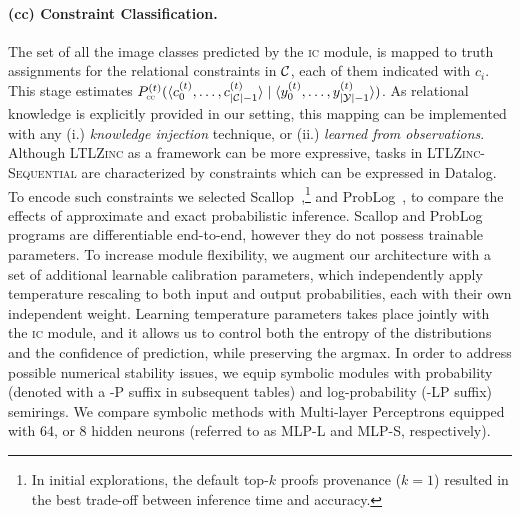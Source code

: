 \paragraph{{\sc (cc)} Constraint Classification.} The set of all the image classes predicted by the \textsc{ic} module, is mapped to truth assignments for the relational constraints in ${\mathcal{C}}$, each of them indicated with $c_i$. This stage estimates $P^{(t)}_{\text{\sc\tiny cc}}(\langle c_{0}^{(t)}, \ldots, c_{|{\mathcal{C}}| - 1}^{(t)}\rangle \mid \langle y_{0}^{(t)}, \ldots, y_{|{\mathcal{Y}}|-1}^{(t)}\rangle)$. As relational knowledge is explicitly provided in our setting, this mapping can be implemented with any (i.) \textit{knowledge injection} technique, or (ii.) \textit{learned from observations}. 
Although \textsc{LTLZinc} as a framework can be more expressive, tasks in \textsc{LTLZinc-Sequential} are characterized by constraints which can be expressed in Datalog. To encode such constraints we selected Scallop~\cite{li2023scallop},\footnote{In initial explorations, the default top-$k$ proofs provenance ($k=1$) resulted in the best trade-off between inference time and accuracy.} and ProbLog~\cite{de2007problog}, to compare the effects of approximate and exact probabilistic inference.
Scallop and ProbLog programs are differentiable end-to-end, however they do not possess trainable parameters. To increase module flexibility, we augment our architecture with a set of additional learnable calibration parameters, which independently apply temperature rescaling to both input and output probabilities, each with their own independent weight. 
Learning temperature parameters takes place jointly with the \textsc{ic} module, and it allows us to control both the entropy of the distributions and the confidence of prediction, while preserving the argmax. In order to address possible numerical stability issues, we equip symbolic modules with probability (denoted with a -P suffix in subsequent tables) and log-probability (-LP suffix) semirings.
%
We compare symbolic methods with Multi-layer Perceptrons equipped with 64, or 8 hidden neurons (referred to as MLP-L and MLP-S, respectively).

